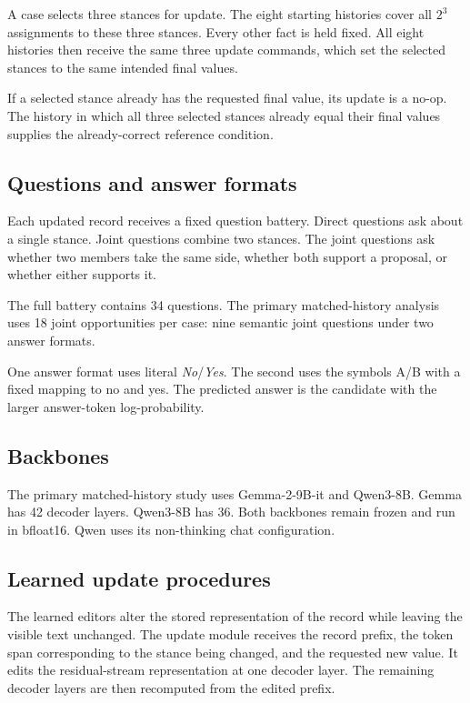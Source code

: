 \documentclass{article}
\begin{document}
A case selects three stances for update. The eight starting histories cover
all $2^3$ assignments to these three stances. Every other fact is held fixed.
All eight histories then receive the same three update commands, which set
the selected stances to the same intended final values.

If a selected stance already has the requested final value, its update is a
no-op. The history in which all three selected stances already equal their
final values supplies the already-correct reference condition.

\subsection{Questions and answer formats}

Each updated record receives a fixed question battery. Direct questions ask
about a single stance. Joint questions combine two stances. The joint
questions ask whether two members take the same side, whether both support a
proposal, or whether either supports it.

The full battery contains 34 questions. The primary matched-history analysis
uses 18 joint opportunities per case: nine semantic joint questions under two
answer formats.

One answer format uses literal \emph{No}/\emph{Yes}. The second uses the
symbols A/B with a fixed mapping to no and yes. The predicted answer is the
candidate with the larger answer-token log-probability.

\subsection{Backbones}

The primary matched-history study uses Gemma-2-9B-it and Qwen3-8B. Gemma has
42 decoder layers. Qwen3-8B has 36. Both backbones remain frozen and run in
bfloat16. Qwen uses its non-thinking chat configuration.

\subsection{Learned update procedures}

The learned editors alter the stored representation of the record while
leaving the visible text unchanged. The update module receives the record
prefix, the token span corresponding to the stance being changed, and the
requested new value. It edits the residual-stream representation at one
decoder layer. The remaining decoder layers are then recomputed from the
edited prefix.
\end{document}
